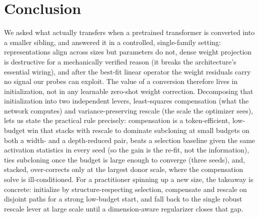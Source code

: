 \section{Conclusion}
\label{sec:conclusion}

We asked what actually transfers when a pretrained transformer is converted into a
smaller sibling, and answered it in a controlled, single-family setting:
representations align across sizes but parameters do not, dense weight projection
is destructive for a mechanically verified reason (it breaks the architecture's
essential wiring), and after the best-fit linear operator the weight residuals
carry no signal our probes can exploit. The value of a conversion therefore lives in initialization, not
in any learnable zero-shot weight correction. Decomposing that initialization into
two independent levers, least-squares compensation (what the network
computes) and variance-preserving rescale (the scale the optimizer sees),
lets us state the practical rule precisely: compensation is a token-efficient,
low-budget win that stacks with rescale to dominate subcloning at small budgets on
both a width- and a depth-reduced pair, beats a selection baseline given the same
activation statistics in every seed (so the gain is the re-fit, not the
information), ties subcloning once the budget is large enough to converge (three
seeds), and, stacked, over-corrects only at the largest donor scale, where the
compensation solve is ill-conditioned. For a practitioner spinning up a new size,
the takeaway is concrete: initialize by structure-respecting selection, compensate
and rescale on disjoint paths for a strong low-budget start, and fall back to the
single robust rescale lever at large scale until a dimension-aware regularizer
closes that gap.
